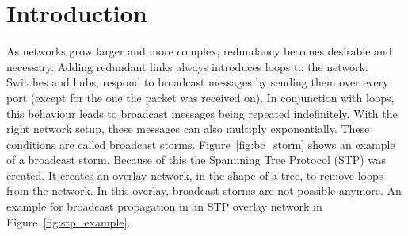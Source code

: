 \chapter{Introduction}
As networks grow larger and more complex, redundancy becomes desirable and necessary.
Adding redundant links always introduces loops to the network.
Switches and hubs, respond to broadcast messages by sending them over every port (except for the one the packet was received on).
In conjunction with loops, this behaviour leads to broadcast messages being repeated indefinitely.
With the right network setup, these messages can also multiply exponentially. 
These conditions are called broadcast storms\cite{bstorm}.
Figure~\ref{fig:bc_storm} shows an example of a broadcast storm.
Because of this the Spannning Tree Protocol (STP)\cite{perlman85} was created.
It creates an overlay network, in the shape of a tree, to remove loops from the network.
In this overlay, broadcast storms are not possible anymore.
An example for broadcast propagation in an STP overlay network in Figure~\ref{fig:stp_example}.


